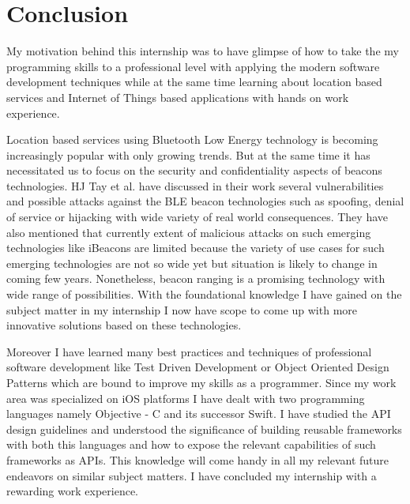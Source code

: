 \section{Conclusion}
My motivation behind this internship was to have glimpse of how to take the my programming skills to a professional level with applying the modern software development techniques while at the same time learning about location based services and Internet of Things based applications with hands on work experience. 
\par Location based services using Bluetooth Low Energy technology is becoming increasingly popular with only growing trends. But at the same time it has necessitated us to focus on the security and confidentiality aspects of  beacons technologies. HJ Tay et al. \cite{tay2016survey} have discussed in their work several vulnerabilities and possible attacks against the BLE beacon technologies such as spoofing, denial of service or hijacking with wide variety of real world consequences. They have also mentioned that currently extent of malicious attacks on such emerging technologies like iBeacons are limited because the variety of use cases for such emerging technologies are not so wide yet but situation is likely to change in coming few years. Nonetheless, beacon ranging is a promising technology with wide range of possibilities. With the foundational knowledge I have gained on the subject matter in my internship I now have scope to come up with more innovative solutions based on these technologies.
\par Moreover I have learned many best practices and techniques of professional software development like Test Driven Development or Object Oriented Design Patterns which are bound to improve my skills as a programmer. Since my work area was specialized on iOS platforms I have dealt with two programming languages namely Objective - C and its successor Swift. I have studied the API design guidelines and understood the significance of building reusable frameworks with both this languages and how to expose the relevant capabilities of such frameworks as APIs. This knowledge will come handy in all my relevant future endeavors on similar subject matters. I have concluded my internship with a rewarding work experience. 